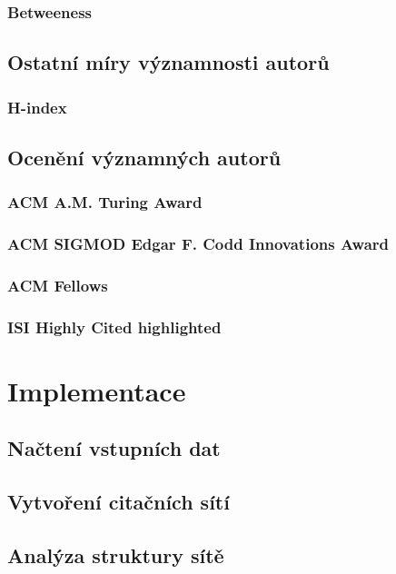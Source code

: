 \documentclass[12pt]{article}
\begin{document}
\subsubsection{Betweeness}

\subsection{Ostatní míry významnosti autorů}
\subsubsection{H-index}

\subsection{Ocenění významných autorů}
\subsubsection{ACM A.M. Turing Award}
\subsubsection{ACM SIGMOD Edgar F. Codd Innovations Award}
\subsubsection{ACM Fellows}
\subsubsection{ISI Highly Cited highlighted}

\section{Implementace}
\subsection{Načtení vstupních dat}

\subsection{Vytvoření citačních sítí}

\subsection{Analýza struktury sítě}
\end{document}
